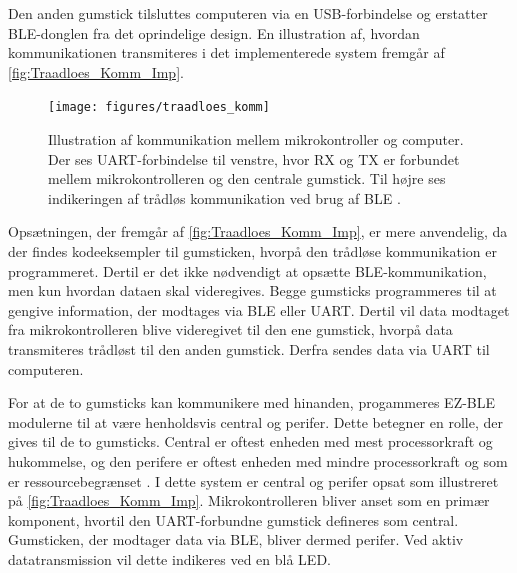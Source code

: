 Den anden gumstick tilsluttes computeren via en USB-forbindelse og erstatter BLE-donglen fra det oprindelige design. En illustration af, hvordan kommunikationen transmiteres i det implementerede system fremgår af \autoref{fig:Traadloes_Komm_Imp}.

\begin{figure}[H]
	\centering
	\texttt{[image: figures/traadloes\_komm]}
	\caption{Illustration af kommunikation mellem mikrokontroller og computer. Der ses UART-forbindelse til venstre, hvor RX og TX er forbundet mellem mikrokontrolleren og den centrale gumstick. Til højre ses indikeringen af trådløs kommunikation ved brug af BLE \citep{cypresspsoc2015, cypresspsoc42015}.} 
	\label{fig:Traadloes_Komm_Imp}
\end{figure}

\noindent
Opsætningen, der fremgår af \autoref{fig:Traadloes_Komm_Imp}, er mere anvendelig, da der findes kodeeksempler til gumsticken, hvorpå den trådløse kommunikation er programmeret. 
Dertil er det ikke nødvendigt at opsætte BLE-kommunikation, men kun hvordan dataen skal videregives. 
Begge gumsticks programmeres til at gengive information, der modtages via BLE eller UART. 
Dertil vil data modtaget fra mikrokontrolleren blive videregivet til den ene gumstick, hvorpå data transmiteres trådløst til den anden gumstick. 
Derfra sendes data via UART til computeren. 

For at de to gumsticks kan kommunikere med hinanden, progammeres EZ-BLE modulerne til at være henholdsvis central og perifer. 
Dette betegner en rolle, der gives til de to gumsticks. 
Central er oftest enheden med mest processorkraft og hukommelse, og den perifere er oftest enheden med mindre processorkraft og som er ressourcebegrænset \citep{townsend2014}. 
I dette system er central og perifer opsat som illustreret på \autoref{fig:Traadloes_Komm_Imp}. 
Mikrokontrolleren bliver anset som en primær komponent, hvortil den UART-forbundne gumstick defineres som central. 
Gumsticken, der modtager data via BLE, bliver dermed perifer. 
Ved aktiv datatransmission vil dette indikeres ved en blå LED.
